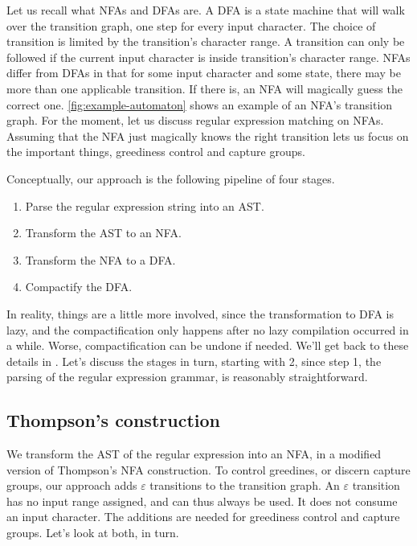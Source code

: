 \documentclass[english]{sigplanconf}
\theoremstyle{definition}
\begin{document}
Let us recall what NFAs and DFAs are. A DFA is a state machine that
will walk over the transition graph, one step for every input
character. The choice of transition is limited by the transition's
character range. A transition can only be followed if the current
input character is inside transition's character range. NFAs differ
from DFAs in that for some input character and some state, there
may be more than one applicable transition. If there is, an
NFA will magically guess the correct one. \autoref{fig:example-automaton}
shows an example of an NFA's transition graph. For the moment, let
us discuss regular expression matching on NFAs. Assuming that the
NFA just magically knows the right transition lets us focus on the
important things, greediness control and capture groups.

Conceptually, our approach is the following pipeline of four stages.
\begin{enumerate}
  \item Parse the regular expression string into an AST.
  \item Transform the AST to an NFA.
  \item Transform the NFA to a DFA. 
  \item Compactify the DFA.
\end{enumerate}

In reality, things are a little more involved, since the transformation
to DFA is lazy, and the compactification only happens after no lazy
compilation occurred in a while. Worse, compactification can be
undone if needed. We'll get back to these details in .
Let's discuss the stages in turn, starting with 2, since step 1,
the parsing of the regular expression grammar, is reasonably
straightforward.

\subsection{Thompson's construction} 

We transform the AST of the regular expression into an NFA,
in a modified version of Thompson's NFA construction. To
control greedines, or discern capture groups, our approach adds
$\varepsilon$ transitions to the transition graph. An
$\varepsilon$ transition has no input range assigned, and can thus always
be used. It does not consume an input character.
The additions are needed for greediness control and capture groups.
Let's look at both, in turn.
\end{document}
